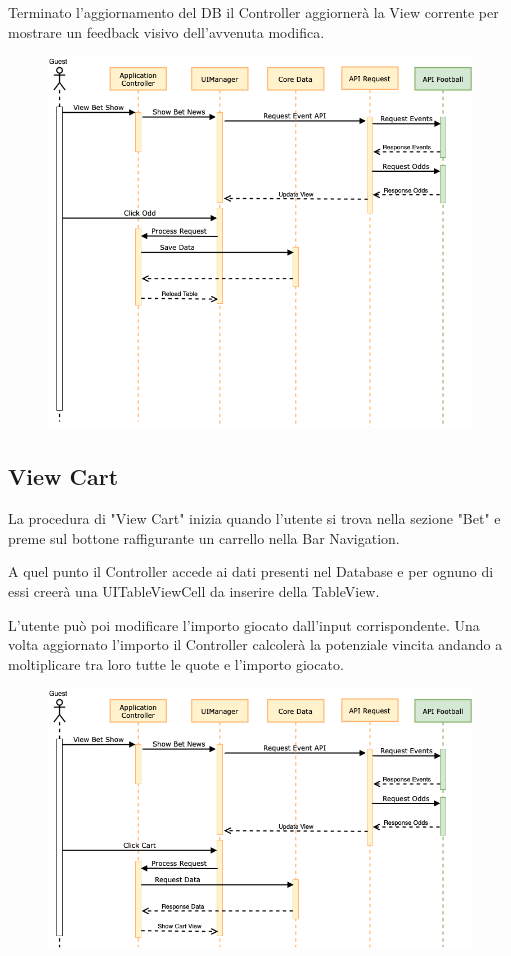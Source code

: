 \documentclass[numbers=noenddot, 12pt, a4paper, oneside]{scrbook}
\begin{document}
Terminato l'aggiornamento del DB il Controller aggiornerà la View corrente per mostrare un feedback visivo dell'avvenuta modifica.
\begin{figure}[H]
	\centering
	\includegraphics[width=1\textwidth]{images/Sequence/SequenceAddOdd}
\end{figure}
\newpage
\subsection*{View Cart}
La procedura di "View Cart" inizia quando l'utente si trova nella sezione "Bet" e preme sul bottone raffigurante un carrello nella Bar Navigation.

A quel punto il Controller accede ai dati presenti nel Database e per ognuno di essi creerà una UITableViewCell da inserire della TableView.

L'utente può poi modificare l'importo giocato dall'input corrispondente. Una volta aggiornato l'importo il Controller calcolerà la potenziale vincita andando a moltiplicare tra loro tutte le quote e l'importo giocato.
\begin{figure}[H]
	\centering
	\includegraphics[width=1\textwidth]{images/Sequence/SequenceViewCart}
\end{figure}
\newpage
\end{document}
